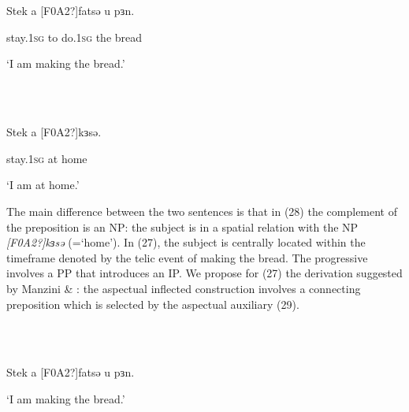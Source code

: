 \documentclass[output=paper]{langsci/langscibook}
\begin{document}
\ea%
    \label{ex:key:27}
    \gll\\
        \\
    \glt
    \z

          Stek     a  [F0A2?]fatsə    u    pɜn.     

stay.\textsc{1sg} to   do\textsc{.1sg} the    bread

‘I am making the bread.’

\ea%
    \label{ex:key:28}
    \gll\\
        \\
    \glt
    \z

          Stek     a  [F0A2?]kɜsə.     

stay.\textsc{1sg} at   home  

‘I am at home.’

The main difference between the two sentences is that in (28) the complement of the preposition is an NP: the subject is in a spatial relation with the NP \textit{[F0A2?]k}\textit{ɜsə} (=‘home’). In (27), the subject is centrally located within the timeframe denoted by the telic event of making the bread. The progressive involves a PP that introduces an IP. We propose for (27) the derivation suggested by Manzini \& \citet{Savoia2005}: the aspectual inflected construction involves a connecting preposition which is selected by the aspectual auxiliary (29). 

\ea%
    \label{ex:key:29}
    \gll\\
        \\
    \glt
    \z

          Stek a [F0A2?]fatsə  u pɜn.     

‘I am making the bread.’

 
\end{document}
